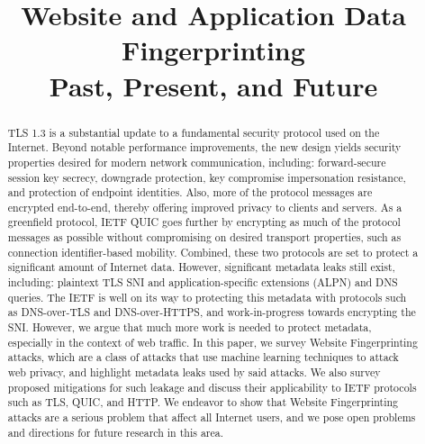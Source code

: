 \documentclass[runningheads]{llncs}
\begin{document}
\title{Website and Application Data Fingerprinting \\ Past, Present, and Future}

\maketitle
\begin{abstract}
TLS 1.3 is a substantial update to a fundamental security protocol used on the Internet.
Beyond notable performance improvements, the new design yields security properties desired
for modern network communication, including: forward-secure session key secrecy, downgrade
protection, key compromise impersonation resistance, and protection of endpoint identities.
Also, more of the protocol messages are encrypted end-to-end, thereby offering improved
privacy to clients and servers. As a greenfield protocol, IETF QUIC goes further by encrypting
as much of the protocol messages as possible without compromising on desired transport
properties, such as connection identifier-based mobility. Combined, these two protocols
are set to protect a significant amount of Internet data. However, significant metadata leaks still exist,
including: plaintext TLS SNI and application-specific extensions (ALPN) and DNS queries.
The IETF is well on its way to protecting this metadata with protocols such as DNS-over-TLS
and DNS-over-HTTPS, and work-in-progress towards encrypting the SNI. However, we argue that
much more work is needed to protect metadata, especially in the context of web traffic.
In this paper, we survey Website Fingerprinting attacks, which are a class of attacks that
use machine learning techniques to attack web privacy, and highlight metadata leaks used
by said attacks. We also survey proposed mitigations for such leakage and discuss their
applicability to IETF protocols such as TLS, QUIC, and HTTP. We endeavor to show that
Website Fingerprinting attacks are a serious problem that affect all Internet users,
and we pose open problems and directions for future research in this area.

\end{abstract}
\end{document}
